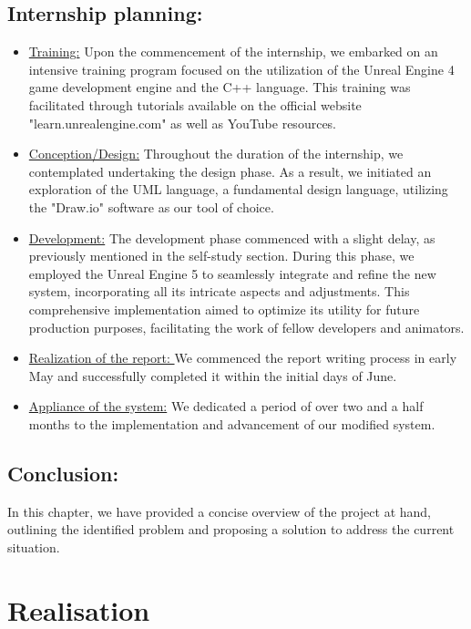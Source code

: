 \documentclass[12pt]{book}
\newenvironment{ConfigureChapter}{
    \centering
        \Centering
        \renewcommand{\thechapter}{\Roman{chapter}}
    }{
    \let\cleardoublepage=\clearpage
    \setcounter{section}{0}
}
\begin{document}
\section{Internship planning:}
\begin{itemize}
    \item \underline{Training:}
          Upon the commencement of the internship, we embarked on an intensive training program
          focused on the utilization of the Unreal Engine 4 game development engine and the
          C++ language. This training was facilitated through tutorials available on the official website
          "learn.unrealengine.com" as well as YouTube resources.
    \item \underline{Conception/Design:}
          Throughout the duration of the internship, we contemplated undertaking the design phase.
          As a result, we initiated an exploration of the UML language, a fundamental design language,
          utilizing the "Draw.io" software as our tool of choice.
    \item  \underline{Development:}
          The development phase commenced with a slight delay, as previously mentioned in the
          self-study section. During this phase, we employed the Unreal Engine 5 to seamlessly integrate
          and refine the new system, incorporating all its intricate aspects and adjustments. This
          comprehensive implementation aimed to optimize its utility for future production purposes,
          facilitating the work of fellow developers and animators.
    \item  \underline{Realization of the report: }
          We commenced the report writing process in early May and successfully completed it
          within the initial days of June.
    \item \underline{Appliance of the system:}
          We dedicated a period of over two and a half months to the implementation and
          advancement of our modified system.
\end{itemize}

\section{Conclusion:}
In this chapter, we have provided a concise overview of the project at hand, outlining the
identified problem and proposing a solution to address the current situation.

\begin{ConfigureChapter}
    \chapter{\textbf{Realisation}}
    \minitoc
\end{ConfigureChapter}
\newpage
\end{document}
